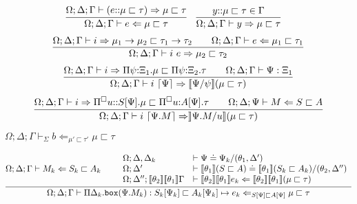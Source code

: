 \documentclass[letterpaper, 11pt]{article}
\newcommand{\Rar}{\Rightarrow}
\newcommand{\Lar}{\Leftarrow}
\newcommand{\rar}{\rightarrow}
\newcommand{\bbox}{\texttt{box}}
\begin{document}
    \begin{align*}
      & \infer{\Omega; \Delta; \Gamma \vdash e \Lar \mu \sqsubset \tau}
        {
          \Omega; \Delta; \Gamma \vdash (e {::} \mu \sqsubset \tau) \Rar \mu \sqsubset \tau
        } &
      & \infer{\Omega; \Delta; \Gamma \vdash y \Rar \mu \sqsubset \tau}{y{::}\mu \sqsubset \tau \in \Gamma}
    \end{align*}
    \begin{align*}
      \infer{\Omega; \Delta; \Gamma \vdash i \ e \Rar \mu_2 \sqsubset \tau_2}
            {
              \Omega; \Delta; \Gamma \vdash i \Rar \mu_1 \rar \mu_2 \sqsubset \tau_1 \rar \tau_2
              &&
              \Omega; \Delta; \Gamma \vdash e \Lar \mu_1 \sqsubset \tau_1
            }
    \end{align*}
    \begin{align*}
      \infer{\Omega; \Delta; \Gamma \vdash i \ \lceil \Psi \rceil \Rar \llbracket \Psi/\psi \rrbracket (\mu \sqsubset \tau)}
            {
              \Omega; \Delta; \Gamma \vdash i \Rar \Pi \psi{:}\Xi_1. \mu \sqsubset \Pi \psi{:}\Xi_2. \tau
              &&
              \Omega; \Delta; \Gamma \vdash \Psi : \Xi_1
            }
    \end{align*}
    \begin{align*}
      \infer{\Omega; \Delta; \Gamma \vdash i \ \lceil \Psi. M \rceil \Rar \rrbracket \Psi. M / u \rrbracket (\mu \sqsubset \tau)}
            {
              \Omega; \Delta; \Gamma \vdash i \Rar \Pi^\square u{::}S[\Psi]. \mu \sqsubset \Pi^\square u{:}A[\Psi]. \tau
              &&
              \Omega; \Delta; \Psi \vdash M \Lar S \sqsubset A
            }
    \end{align*}

    $\boxed{\Omega; \Delta; \Gamma \vdash_\Sigma b \Lar_{\mu' \sqsubset \tau'} \mu \sqsubset \tau}$

    \begin{align*}
      \infer{\Omega; \Delta; \Gamma \vdash \Pi \Delta_k . \bbox(\Psi. M_k) : S_k[\Psi_k]  \sqsubset A_k[\Psi_k] \mapsto e_k 
                                                \Lar_{S[\Psi] \sqsubset A[\Psi]} \mu \sqsubset \tau}
            {
              \Omega; \Delta; \Gamma \vdash M_k \Lar S_k \sqsubset A_k
              &&
              \begin{array}{ll}
                \Omega; \Delta, \Delta_k & \vdash \Psi \doteq \Psi_k / (\theta_1, \Delta') \\
                \Omega; \Delta'          & \vdash \llbracket \theta_1 \rrbracket ( S \sqsubset A) \doteq 
                                                  \llbracket \theta_1 \rrbracket(S_k \sqsubset A_k)/(\theta_2, \Delta'') \\
                \Omega; \Delta'';\llbracket \theta_2 \rrbracket \llbracket \theta_1 \rrbracket \Gamma & \vdash
                                        \llbracket \theta_2 \rrbracket \llbracket \theta_1 \rrbracket e_k 
                                        \Lar \llbracket \theta_2 \rrbracket \llbracket \theta_1 \rrbracket (\mu \sqsubset \tau)
              \end{array}
            }
    \end{align*}
\end{document}
